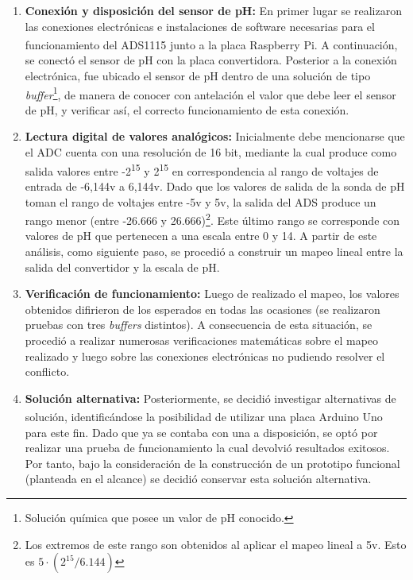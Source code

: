                  \begin{enumerate}

                \item \textbf{Conexión y disposición del sensor de pH:} En primer lugar se realizaron las conexiones electrónicas e instalaciones de software necesarias para el funcionamiento del ADS1115 junto a la placa Raspberry\textsuperscript{\textregistered} Pi. A continuación, se conectó el sensor de pH con la placa convertidora. Posterior a la conexión electrónica, fue ubicado el sensor de pH dentro de una solución de tipo \textit{buffer}\footnote{Solución química que posee un valor de pH conocido.}, de manera de conocer con antelación el valor que debe leer el sensor de pH, y verificar así, el correcto funcionamiento de esta conexión.
                
                \item \textbf{Lectura digital de valores analógicos:} Inicialmente debe mencionarse que el ADC cuenta con una resolución de 16 bit, mediante la cual produce como salida valores entre -2\textsuperscript{15} y 2\textsuperscript{15} en correspondencia al rango de voltajes de entrada de -6,144v a 6,144v. Dado que los valores de salida de la sonda de pH toman el rango de voltajes entre -5v y 5v, la salida del ADS produce un rango menor (entre -26.666 y 26.666)\footnote{ Los extremos de este rango son obtenidos al aplicar el mapeo lineal a 5v. Esto es $ 5 \cdot (2^{15} / 6.144)$  }. Este último rango se corresponde con valores de pH que pertenecen a una escala entre 0 y 14. A partir de este análisis, como siguiente paso, se procedió a construir un mapeo lineal entre la salida del convertidor y la escala de pH.
                
                \item \textbf{Verificación de funcionamiento:} Luego de realizado el mapeo, los valores obtenidos difirieron de los esperados en todas las ocasiones (se realizaron pruebas con tres \textit{buffers} distintos). A consecuencia de esta situación, se procedió a realizar numerosas verificaciones matemáticas sobre el mapeo realizado y luego sobre las conexiones electrónicas no pudiendo resolver el conflicto.
                
                \item \textbf{Solución alternativa:} Posteriormente, se decidió investigar alternativas de solución, identificándose la posibilidad de utilizar una placa Arduino \textsuperscript{\textregistered} Uno para este fin. Dado que ya se contaba con una a disposición, se optó por realizar una prueba de funcionamiento la cual devolvió resultados exitosos. Por tanto, bajo la consideración de la construcción de un prototipo funcional (planteada en el alcance) se decidió conservar esta solución alternativa.
                \end{enumerate}
                
